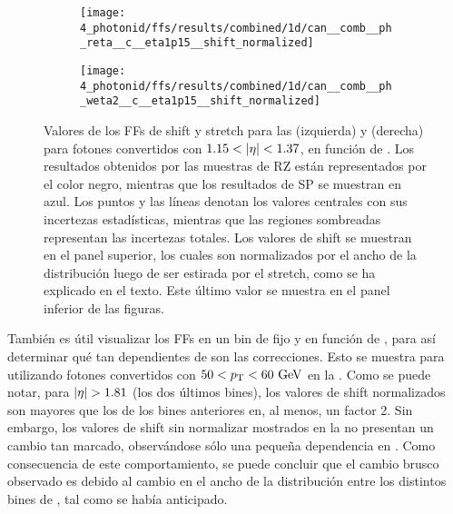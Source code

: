 \begin{figure}[ht!]
    \centering
    \begin{subfigure}[h]{0.49\linewidth}
        \centering
        \texttt{[image: 4\_photonid/ffs/results/combined/1d/can\_\_comb\_\_ph\_reta\_\_c\_\_eta1p15\_\_shift\_normalized]}
        \caption{\reta}
        \label{fig:ss_corrections:ffs:reslts:ffs:reta}
    \end{subfigure}
    \hfill
    \begin{subfigure}[h]{0.49\linewidth}
        \centering
        \texttt{[image: 4\_photonid/ffs/results/combined/1d/can\_\_comb\_\_ph\_weta2\_\_c\_\_eta1p15\_\_shift\_normalized]}
        \caption{\weta}
        \label{fig:ss_corrections:ffs:reslts:ffs:weta}
    \end{subfigure}
    \caption{Valores de los \acp{FF} de shift y stretch para las \reta (izquierda) y \weta (derecha) para fotones convertidos con \(1.15<\abseta<1.37\), en funci\'on de \pt. Los resultados obtenidos por las muestras de \ac{RZ} est\'an representados por el color negro, mientras que los resultados de \ac{SP} se muestran en azul. Los puntos y las l\'ineas denotan los valores centrales con sus incertezas estad\'isticas, mientras que las regiones sombreadas representan las incertezas totales. Los valores de shift se muestran en el panel superior, los cuales son normalizados por el ancho de la distribuci\'on luego de ser estirada por el stretch, como se ha explicado en el texto. Este \'ultimo valor se muestra en el panel inferior de las figuras.}
    \label{fig:ss_corrections:ffs:reslts:ffs}
\end{figure}

También es útil visualizar los \acp{FF} en un bin de \pt fijo y en función de \abseta, para as\'i determinar qu\'e tan dependientes de \abseta son las correcciones. Esto se muestra para \wstot utilizando fotones convertidos con \(50<p_{\text{T}}<60~\text{GeV}\) en la \Fig{\ref{fig:ss_corrections:ffs:reslts:ffs_eta_wstot}}. Como se puede notar, para \(\abseta>1.81\) (los dos últimos bines), los valores de shift normalizados son mayores que los de los bines anteriores en, al menos, un factor 2. Sin embargo, los valores de shift sin normalizar mostrados en la \Fig{\ref{fig:ss_corrections:ffs:reslts:ffs_eta_wstot:raw_shift}} no presentan un cambio tan marcado, observ\'andose s\'olo una peque\~na dependencia en \abseta. Como consecuencia de este comportamiento, se puede concluir que el cambio brusco observado es debido al cambio en el ancho de la distribuci\'on entre los distintos bines de \abseta, tal como se hab\'ia anticipado.


